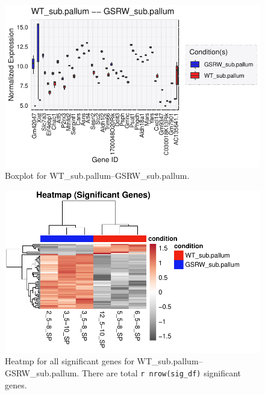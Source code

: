 \documentclass[
  letterpaper,
  DIV=11,
  numbers=noendperiod]{scrartcl}
\newenvironment{Shaded}{\begin{snugshade}}{\end{snugshade}}
\newcommand{\FunctionTok}[1]{\textcolor[rgb]{0.28,0.35,0.67}{#1}}
\newcommand{\NormalTok}[1]{\textcolor[rgb]{0.00,0.23,0.31}{#1}}
\newcommand{\SpecialCharTok}[1]{\textcolor[rgb]{0.37,0.37,0.37}{#1}}
\begin{document}
\begin{figure}[H]

{\centering \includegraphics{sample_report_trial_files/figure-pdf/fig-boxplot_single_2-1.pdf}

}

\caption{\label{fig-boxplot_single_2}Boxplot for
WT\_sub.pallum--GSRW\_sub.pallum.}

\end{figure}

\begin{Shaded}
\end{Shaded}

\begin{figure}[H]

{\centering \includegraphics{sample_report_trial_files/figure-pdf/fig-hm_2-1.pdf}

}

\caption{\label{fig-hm_2}Heatmp for all significant genes for
WT\_sub.pallum--GSRW\_sub.pallum. There are total
\texttt{r\ nrow(sig\_df)} significant genes.}

\end{figure}
\end{document}
